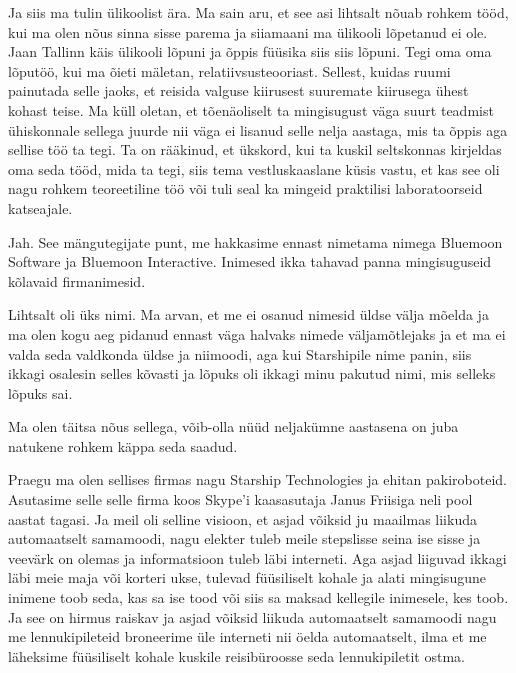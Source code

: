 Ja siis ma tulin ülikoolist ära. Ma sain aru, et see asi lihtsalt nõuab rohkem 
tööd, kui ma olen nõus sinna sisse parema ja siiamaani ma ülikooli lõpetanud ei 
ole. Jaan Tallinn käis ülikooli lõpuni ja õppis 
füüsika siis siis lõpuni. Tegi oma oma lõputöö, kui ma õieti mäletan, 
relatiivsusteooriast. Sellest, kuidas ruumi painutada selle jaoks, et reisida 
valguse kiirusest suuremate kiirusega ühest kohast teise. Ma küll oletan, et 
tõenäoliselt  ta mingisugust väga suurt teadmist ühiskonnale sellega juurde nii 
väga ei lisanud selle nelja aastaga, mis ta õppis aga sellise töö ta tegi. Ta 
on rääkinud, et ükskord, kui ta kuskil seltskonnas kirjeldas oma seda tööd, 
mida ta tegi, siis tema vestluskaaslane küsis  vastu, et kas see oli nagu 
rohkem teoreetiline töö või tuli seal ka mingeid praktilisi laboratoorseid 
katseajale.


Jah. See mängutegijate punt, me hakkasime ennast nimetama nimega Bluemoon 
Software ja Bluemoon Interactive. Inimesed ikka tahavad panna mingisuguseid 
kõlavaid firmanimesid.


Lihtsalt oli üks nimi. Ma arvan, et me ei osanud nimesid üldse välja mõelda ja 
ma olen kogu aeg pidanud ennast väga halvaks nimede väljamõtlejaks ja et ma ei 
valda seda valdkonda üldse ja niimoodi, aga kui Starshipile nime panin, siis ikkagi osalesin selles kõvasti ja  lõpuks oli 
ikkagi minu pakutud nimi, mis selleks lõpuks sai.


Ma olen täitsa nõus sellega, võib-olla nüüd neljakümne aastasena on juba 
natukene rohkem käppa seda saadud. 


Praegu ma olen sellises firmas nagu Starship Technologies ja ehitan 
pakiroboteid. Asutasime selle selle firma koos Skype'i kaasasutaja 
Janus Friisiga  neli pool aastat 
tagasi. Ja meil oli selline 
visioon, et asjad võiksid ju maailmas liikuda automaatselt samamoodi, nagu 
elekter tuleb meile stepslisse seina ise sisse ja veevärk on olemas ja 
informatsioon tuleb läbi interneti. Aga asjad liiguvad ikkagi  läbi meie maja 
või korteri ukse, tulevad füüsiliselt kohale ja alati mingisugune inimene toob 
seda, kas sa ise tood või siis sa maksad kellegile inimesele, kes toob. Ja see 
on hirmus raiskav ja asjad võiksid liikuda automaatselt samamoodi nagu me 
lennukipileteid broneerime üle interneti nii öelda automaatselt, ilma et me 
läheksime füüsiliselt kohale kuskile reisibüroosse seda lennukipiletit ostma.

